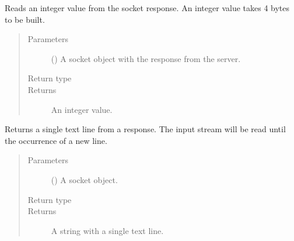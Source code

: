 \documentclass[letterpaper,10pt,english]{sphinxmanual}
\begin{document}

\begin{fulllineitems}
\label{\detokenize{index:secondodb.api.support.secondoinputhandler.read_int}}
Reads an integer value from the socket response. An integer value takes 4 bytes to be built.
\begin{quote}\begin{description}
\item[{Parameters}] \leavevmode
{} () \textendash{} A socket object with the response from the  server.

\item[{Return type}] \leavevmode
{}

\item[{Returns}] \leavevmode
An integer value.

\end{description}\end{quote}

\end{fulllineitems}


\begin{fulllineitems}
\label{\detokenize{index:secondodb.api.support.secondoinputhandler.read_line_of_text}}
Returns a single text line from a response. The input stream will be read until the occurrence of a new line.
\begin{quote}\begin{description}
\item[{Parameters}] \leavevmode
{} () \textendash{} A socket object.

\item[{Return type}] \leavevmode
{}

\item[{Returns}] \leavevmode
A string with a single text line.

\end{description}\end{quote}

\end{fulllineitems}
\end{document}
